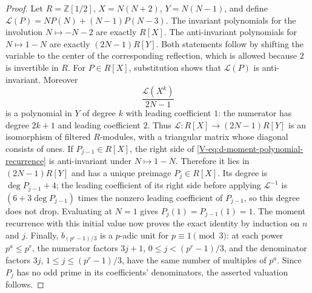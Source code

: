 \documentclass[11pt,letterpaper]{article}
\numberwithin{equation}{section}
\begin{document}
\begin{proof}
Let $R=\mathbb Z[1/2]$, $X=N(N+2)$, $Y=N(N-1)$, and define
$\mathcal L(P)=NP(N)+(N-1)P(N-3)$.
The invariant polynomials for the involution $N\mapsto-N-2$ are
exactly $R[X]$. The anti-invariant polynomials for $N\mapsto1-N$
are exactly $(2N-1)R[Y]$. Both statements follow by shifting the
variable to the center of the corresponding reflection, which is
allowed because $2$ is invertible in $R$.
For $P\in R[X]$, substitution shows that $\mathcal L(P)$ is
anti-invariant. Moreover
\[
 \frac{\mathcal L(X^k)}{2N-1}
\]
is a polynomial in $Y$ of degree $k$ with leading coefficient $1$:
the numerator has degree $2k+1$ and leading coefficient $2$.
Thus $\mathcal L:R[X]\to(2N-1)R[Y]$ is an isomorphism of filtered
$R$-modules, with a triangular matrix whose diagonal consists of
ones.
If $P_{j-1}\in R[X]$, the right side of
\eqref{V-eq:d-moment-polynomial-recurrence} is anti-invariant under
$N\mapsto1-N$. Therefore it lies in $(2N-1)R[Y]$ and has a unique
preimage $P_j\in R[X]$. Its degree is $\deg P_{j-1}+4$; the leading
coefficient of its right side before applying $\mathcal L^{-1}$ is
$(6+3\deg P_{j-1})$ times the nonzero leading coefficient of
$P_{j-1}$, so this degree does not drop. Evaluating at $N=1$ gives
$P_j(1)=P_{j-1}(1)=1$.
The moment recurrence with this initial value now proves the exact
identity by induction on $n$ and $j$.
Finally, $b_{(p^r-1)/3}$ is a $p$-adic unit for $p\equiv1\pmod3$: at
each power $p^a\le p^r$, the numerator factors $3j+1$,
$0\le j<(p^r-1)/3$, and the denominator factors $3j$,
$1\le j\le(p^r-1)/3$, have the same number of multiples of $p^a$.
Since $P_j$ has no odd prime in its coefficients' denominators,
the asserted valuation follows.
\end{proof}
\end{document}
